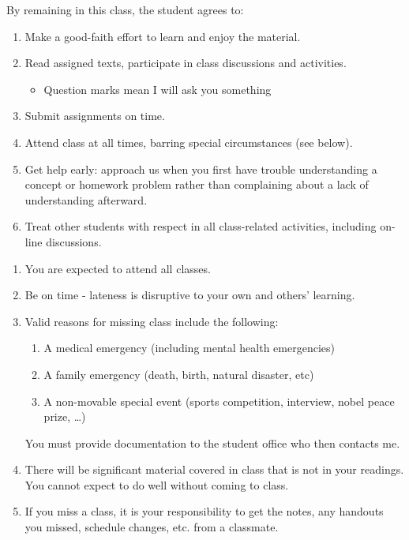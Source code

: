 \documentclass[headrule,footrule]{foils}
\begin{document}








By remaining in this class, the student agrees to:
\begin{enumerate}
\item  Make a good-faith effort to learn and enjoy the material.
\item  Read assigned texts, participate in class discussions and
  activities.
  \begin{itemize}
  \item Question marks mean I will ask you something\task
  \end{itemize}
\item Submit assignments on time.
\item Attend class at all times, barring special circumstances (see below).
\item Get help early: approach us when you first have trouble understanding a concept or homework problem rather than complaining about a lack of understanding afterward.
\item Treat other students with respect in all class-related activities, including on-line discussions.
\end{enumerate}
\begin{enumerate}
\item You are expected to attend all classes.
\item Be on time - lateness is disruptive to your own and others' learning.
\item Valid reasons for missing class include the following:
\begin{enumerate}
\item A medical emergency (including mental health emergencies)
\item A family emergency (death, birth, natural disaster, etc)
\item A non-movable special event (sports competition, interview,
  nobel peace prize, \ldots{})
\end{enumerate}
You must provide documentation to the student office who then contacts
me.
\item There will be significant material covered in class that is not in your readings.  You cannot expect to do well without coming to class.
\item If you miss a class, it is your responsibility to get the notes, any handouts you missed, schedule changes, etc. from a classmate.
\end{enumerate}
\end{document}
